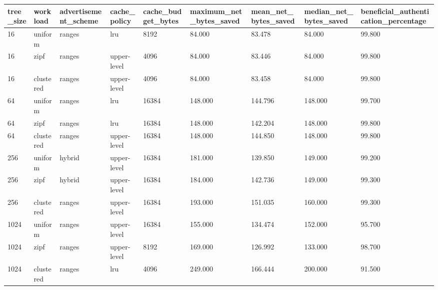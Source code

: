 \begin{tabular}{lllllllll}
tree\_size & workload & advertisement\_scheme & cache\_policy & cache\_budget\_bytes & maximum\_net\_bytes\_saved & mean\_net\_bytes\_saved & median\_net\_bytes\_saved & beneficial\_authentication\_percentage \\ \hline
16 & uniform & ranges & lru & 8192 & 84.000 & 83.478 & 84.000 & 99.800 \\
16 & zipf & ranges & upper-level & 4096 & 84.000 & 83.446 & 84.000 & 99.800 \\
16 & clustered & ranges & upper-level & 4096 & 84.000 & 83.458 & 84.000 & 99.800 \\
64 & uniform & ranges & lru & 16384 & 148.000 & 144.796 & 148.000 & 99.700 \\
64 & zipf & ranges & lru & 16384 & 148.000 & 142.204 & 148.000 & 99.800 \\
64 & clustered & ranges & upper-level & 16384 & 148.000 & 144.850 & 148.000 & 99.800 \\
256 & uniform & hybrid & upper-level & 16384 & 181.000 & 139.850 & 149.000 & 99.200 \\
256 & zipf & hybrid & upper-level & 16384 & 184.000 & 142.736 & 149.000 & 99.300 \\
256 & clustered & ranges & upper-level & 16384 & 193.000 & 151.035 & 160.000 & 99.300 \\
1024 & uniform & ranges & upper-level & 16384 & 155.000 & 134.474 & 152.000 & 95.700 \\
1024 & zipf & ranges & upper-level & 8192 & 169.000 & 126.992 & 133.000 & 98.700 \\
1024 & clustered & ranges & lru & 4096 & 249.000 & 166.444 & 200.000 & 91.500 \\
\end{tabular}

